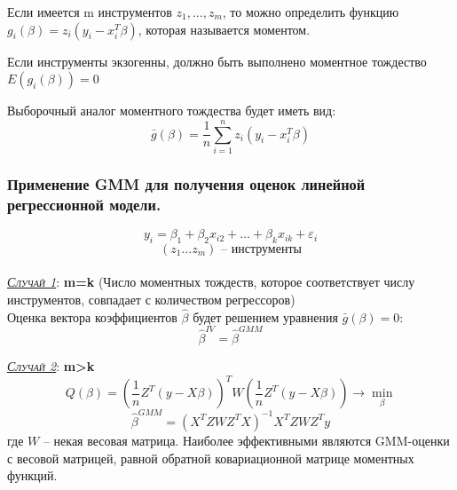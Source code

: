 \documentclass[a0,final]{a0poster}
\begin{document}
\begin{multicols}{4}



\begin{tcolorbox}[colback=red!5!white,colframe=red!75!black]
Если имеется m инструментов $z_1,...,z_m$, то можно определить функцию $g_i(\beta) = z_i(y_i - x_i^T\beta)$, которая называется моментом.
\end{tcolorbox}
\begin{tcolorbox}[colback=green!5!white,colframe=green!75!black]
Если инструменты экзогенны, должно быть выполнено моментное тождество $E(g_i(\beta)) = 0$
\end{tcolorbox}

\begin{tcolorbox}[colback=purple!5!white,colframe=purple!75!black]
Выборочный аналог моментного тождества будет иметь вид:
$$\bar{g}(\beta)= \frac{1}{n}\sum\limits_{i=1}^n z_i(y_i-x_i^T\beta)$$
\end{tcolorbox}

\subsubsection*{\textbf{Применение GMM для получения оценок линейной регрессионной модели.}}
$$y_i=\beta_1+\beta_2x_{i2}+\dotsc+\beta_kx_{ik}+\varepsilon_i$$
$$(z_1 \dots z_m) \text{ -- инструменты}$$
\\
\underline{\textsc{\textit{Случай 1}}}: \textbf{m=k} (Число моментных тождеств, которое соответствует числу инструментов, совпадает с количеством регрессоров)\\
Оценка вектора коэффициентов $\hat{\beta}$ будет решением уравнения $\bar{g}(\beta)=0:$
$$\hat{\beta}^{IV} =\hat{\beta}^{GMM}$$

\underline{\textsc{\textit{Случай 2}}}: \textbf{m>k}
$$Q(\beta)={(\frac{1}{n}Z^T(y-X\beta))}^T{W}(\frac{1}{n}Z^T(y-X\beta))\rightarrow\underset{\beta}{\min}$$
$$\hat{\beta}^{GMM}={(X^TZWZ^TX)}^{-1}X^TZWZ^Ty$$
где $W$ – некая весовая матрица.
Наиболее эффективными являются GMM-оценки с весовой матрицей, равной обратной ковариационной матрице моментных функций.


\end{multicols}
\end{document}
